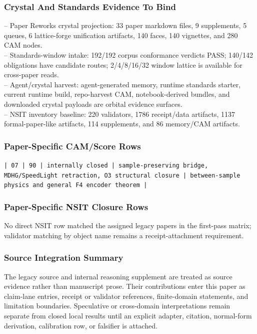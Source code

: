 \documentclass[11pt]{article}
\begin{document}
\subsubsection*{Crystal And Standards Evidence To Bind}

\noindent{}-- Paper Reworks crystal projection: 33 paper markdown files, 9 supplements, 5 queues, 6 lattice-forge unification artifacts, 140 faces, 140 vignettes, and 280 CAM nodes.\\
\noindent{}-- Standards-window intake: 192/192 corpus conformance verdicts PASS; 140/142 obligations have candidate routes; 2/4/8/16/32 window lattice is available for cross-paper reads.\\
\noindent{}-- Agent/crystal harvest: agent-generated memory, runtime standards starter, current runtime build, repo-harvest CAM, notebook-derived bundles, and downloaded crystal payloads are orbital evidence surfaces.\\
\noindent{}-- NSIT inventory baseline: 220 validators, 1786 receipt/data artifacts, 1137 formal-paper-like artifacts, 114 supplements, and 86 memory/CAM artifacts.\\

\subsubsection*{Paper-Specific CAM/Score Rows}

\noindent\texttt{| 07 | 90 | internally closed | sample-preserving bridge, MDHG/SpeedLight retraction, O3 structural closure | between-sample physics and general F4 encoder theorem |}\\

\subsubsection*{Paper-Specific NSIT Closure Rows}

No direct NSIT row matched the assigned legacy papers in the first-pass matrix; validator matching by object name remains a receipt-attachment requirement.

\subsubsection*{Source Integration Summary}

The legacy source and internal reasoning supplement are treated as source
evidence rather than manuscript prose. Their contributions enter this paper as
claim-lane entries, receipt or validator references, finite-domain statements,
and limitation boundaries. Speculative or cross-domain interpretations remain
separate from closed local results until an explicit adapter, citation,
normal-form derivation, calibration row, or falsifier is attached.
\end{document}
